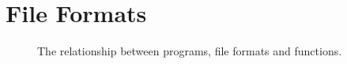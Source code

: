 \section{File Formats}

\begin{figure}[tbp]
  
  \caption{The relationship between programs, file formats and functions.}
  \label{fig:bg:fileformats}
\end{figure}
